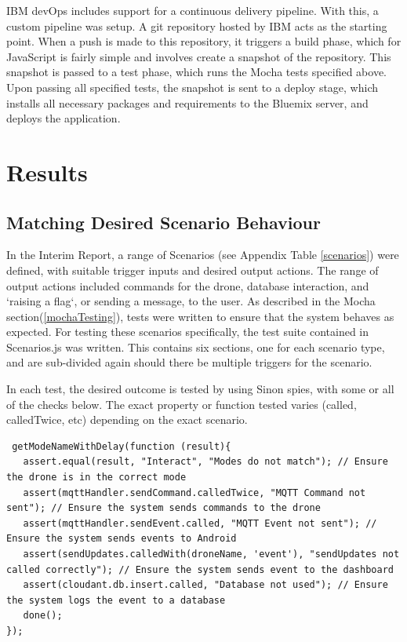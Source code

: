 \documentclass{article}
\begin{document}
IBM devOps includes support for a continuous delivery pipeline. With this, a custom pipeline was setup. A git repository hosted by IBM acts as the starting point. When a push is made to this repository, it triggers a build phase, which for JavaScript is fairly simple and involves create a snapshot of the repository. This snapshot is passed to a test phase, which runs the Mocha tests specified above. Upon passing all specified tests, the snapshot is sent to a deploy stage, which installs all necessary packages and requirements to the Bluemix server, and deploys the application. 




\section{Results}

\subsection{Matching Desired Scenario Behaviour}\label{resultsScenarios}
In the Interim Report, a range of Scenarios (see Appendix Table \ref{scenarios}) were defined, with suitable trigger inputs and desired output actions. The range of output actions included commands for the drone, database interaction, and `raising a flag`, or sending a message, to the user. As described in the Mocha section(\ref{mochaTesting}), tests were written to ensure that the system behaves as expected. For testing these scenarios specifically, the test suite contained in Scenarios.js was written. This contains six sections, one for each scenario type, and are sub-divided again should there be multiple triggers for the scenario. 

In each test, the desired outcome is tested by using Sinon spies, with some or all of the checks below. The exact property or function tested varies (called, calledTwice, etc) depending on the exact scenario.
\begin{lstlisting}
 getModeNameWithDelay(function (result){
   assert.equal(result, "Interact", "Modes do not match"); // Ensure the drone is in the correct mode
   assert(mqttHandler.sendCommand.calledTwice, "MQTT Command not sent"); // Ensure the system sends commands to the drone
   assert(mqttHandler.sendEvent.called, "MQTT Event not sent"); // Ensure the system sends events to Android
   assert(sendUpdates.calledWith(droneName, 'event'), "sendUpdates not called correctly"); // Ensure the system sends event to the dashboard
   assert(cloudant.db.insert.called, "Database not used"); // Ensure the system logs the event to a database
   done();               
});
\end{lstlisting}
\end{document}
